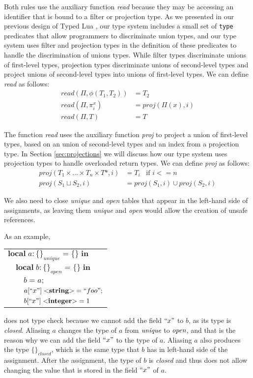 \documentclass[preprint]{sigplanconf}
\newcommand{\Integer}{\mathbf{integer}}
\newcommand{\String}{\mathbf{string}}
\newcommand{\penv}{\Pi}
\begin{document}
Both rules use the auxiliary function \emph{read} because they may be
accessing an identifier that is bound to a filter or projection type.
As we presented in our previous design of Typed Lua \cite{maidl2014tl},
our type system includes a small set of \texttt{type} predicates that allow
programmers to discriminate union types, and our type system uses filter and
projection types in the definition of these predicates to handle the discrimination
of unions types.
While filter types discriminate unions of first-level types, projection
types discriminate unions of second-level types and project unions of
second-level types into unions of first-level types.
We can define \emph{read} as follows:
\begin{align*}
read(\penv, \phi(T_{1},T_{2})) & = T_{2}\\
read(\penv, \pi_{i}^{x}) & = proj(\penv(x), i)\\
read(\penv, T) & = T
\end{align*}

The function \emph{read} uses the auxiliary function \emph{proj}
to project a union of first-level types, based on an union of
second-level types and an index from a projection type.
In Section \ref{sec:projections} we will discuss how our type system uses
projection types to handle overloaded return types.
We can define \emph{proj} as follows:
\begin{align*}
proj(T_{1} \times ... \times T_{n} \times T{*}, i) & =  T_{i} \;\;\; \text{if $i <= n$}\\
proj(S_{1} \sqcup S_{2}, i) & = proj(S_{1}, i) \cup proj(S_{2}, i)
\end{align*}

We also need to close \emph{unique} and \emph{open} tables that
appear in the left-hand side of assignments, as leaving them
\emph{unique} and \emph{open} would allow the creation of
unsafe references.

As an example,
\begin{center}
\begin{tabular}{lll}
\multicolumn{3}{l}{$\mathbf{local} \; a:\{\}_{unique} = \{\} \; \mathbf{in}$}\\
& \multicolumn{2}{l}{$\mathbf{local} \; b:\{\}_{open} = \{\} \; \mathbf{in}$}\\
& & \multicolumn{1}{l}{$b = a;$}\\
& & \multicolumn{1}{l}{$a[``x"] \; {<}\String{>} = ``foo";$}\\
& & \multicolumn{1}{l}{$b[``x"] \; {<}\Integer{>} = 1$}\\
\end{tabular}
\end{center}
does not type check because we cannot add the field $``x"$ to $b$,
as its type is \emph{closed}.
Aliasing $a$ changes the type of $a$ from $\emph{unique}$ to
$\emph{open}$, and that is the reason why we can add the field
$``x"$ to the type of $a$.
Aliasing $a$ also produces the type $\{\}_{closed}$, which is
the same type that $b$ has in left-hand side of the assignment.
After the assignment, the type of $b$ is \emph{closed} and thus
does not allow changing the value that is stored in the field
$``x"$ of $a$.
\end{document}
